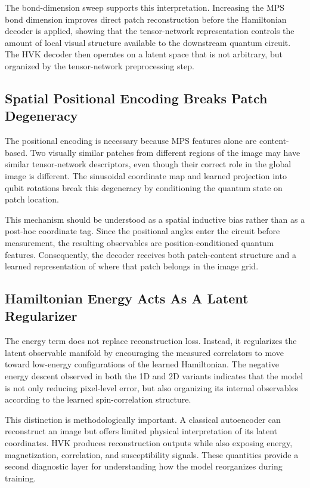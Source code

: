 \documentclass[11pt]{article}
\begin{document}
The bond-dimension sweep supports this interpretation. Increasing the MPS bond dimension improves direct patch reconstruction before the Hamiltonian decoder is applied, showing that the tensor-network representation controls the amount of local visual structure available to the downstream quantum circuit. The HVK decoder then operates on a latent space that is not arbitrary, but organized by the tensor-network preprocessing step.

\subsection{Spatial Positional Encoding Breaks Patch Degeneracy}

The positional encoding is necessary because MPS features alone are content-based. Two visually similar patches from different regions of the image may have similar tensor-network descriptors, even though their correct role in the global image is different. The sinusoidal coordinate map and learned projection into qubit rotations break this degeneracy by conditioning the quantum state on patch location.

This mechanism should be understood as a spatial inductive bias rather than as a post-hoc coordinate tag. Since the positional angles enter the circuit before measurement, the resulting observables are position-conditioned quantum features. Consequently, the decoder receives both patch-content structure and a learned representation of where that patch belongs in the image grid.

\subsection{Hamiltonian Energy Acts As A Latent Regularizer}

The energy term does not replace reconstruction loss. Instead, it regularizes the latent observable manifold by encouraging the measured correlators to move toward low-energy configurations of the learned Hamiltonian. The negative energy descent observed in both the 1D and 2D variants indicates that the model is not only reducing pixel-level error, but also organizing its internal observables according to the learned spin-correlation structure.

This distinction is methodologically important. A classical autoencoder can reconstruct an image but offers limited physical interpretation of its latent coordinates. HVK produces reconstruction outputs while also exposing energy, magnetization, correlation, and susceptibility signals. These quantities provide a second diagnostic layer for understanding how the model reorganizes during training.
\end{document}
